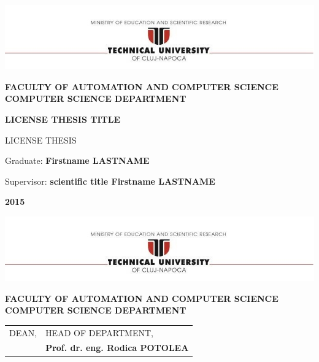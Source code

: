 \documentclass[12pt,a4paper,twoside]{report}
\renewcommand{\thesisyear}{2015}      %
\renewcommand{\thesistitle}{LICENSE THESIS TITLE}
\renewcommand{\thesissupervisor}{scientific title Firstname LASTNAME}
\newcommand{\department}{\bf FACULTY OF AUTOMATION AND COMPUTER SCIENCE\\
COMPUTER SCIENCE DEPARTMENT}
\newcommand{\utcnlogo}{\includegraphics[width=15cm]{img/tucn.jpg}}
\begin{document}

\newenvironment{definition}[1][Definition]{\begin{trivlist}
\item[\hskip \labelsep {\bfseries #1}]}{\end{trivlist}}




\setcounter{page}{4}



\begin{center}
\utcnlogo

\department

\vspace{4cm}

{\bf \thesistitle} %

\vspace{1.5cm}

LICENSE THESIS

\vspace{6cm}

Graduate: {\bf Firstname LASTNAME} 

Supervisor: {\bf \thesissupervisor}

\vspace{3cm}
{\bf \thesisyear}
\end{center}

\thispagestyle{empty}
\newpage

\begin{center}
\utcnlogo

\department

\end{center}
\vspace{0.5cm}

\begin{tabular}{p{7cm}p{8cm}}
 \hspace{-1cm}DEAN, & HEAD OF DEPARTMENT,\\
\hspace{-1cm}{\bf Prof. dr. eng. Liviu MICLEA} & {\bf Prof. dr. eng. Rodica POTOLEA}\\  
\end{tabular}
 
\end{document}
